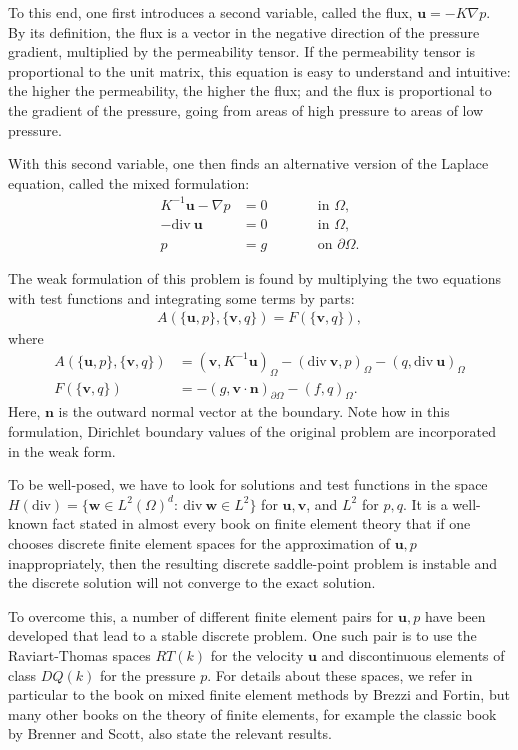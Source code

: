 \documentclass{article}
\renewcommand{\vec}[1]{\mathbf{#1}}
\begin{document}
To this end, one first introduces a second variable, called the flux, $\vec
u=-K\nabla p$. By its definition, the flux is a vector in the negative
direction of the pressure gradient, multiplied by the permeability tensor. If
the permeability tensor is proportional to the unit matrix, this equation is
easy to understand and intuitive: the higher the permeability, the higher the
flux; and the flux is proportional to the gradient of the pressure, going from
areas of high pressure to areas of low pressure.

With this second variable, one then finds an alternative version of the
Laplace equation, called the mixed formulation:
\begin{align*}
  K^{-1} \vec u - \nabla p &= 0 \qquad && \text{in $\Omega$}, \\
  -\text{div}\ \vec u &= 0 \qquad && \text{in $\Omega$}, \\
  p &= g \qquad && \text{on $\partial\Omega$}.
\end{align*}

The weak formulation of this problem is found by multiplying the two
equations with test functions and integrating some terms by parts:
\begin{align*}
  A(\{\vec u,p\},\{\vec v,q\}) = F(\{\vec v,q\}),
\end{align*}
where
\begin{align*}
  A(\{\vec u,p\},\{\vec v,q\})
  &=
  (\vec v, K^{-1}\vec u)_\Omega - (\text{div}\ \vec v, p)_\Omega
  - (q,\text{div}\ \vec u)_\Omega
  \\
  F(\{\vec v,q\}) &= -(g,\vec v\cdot \vec n)_{\partial\Omega} - (f,q)_\Omega.
\end{align*}
Here, $\vec n$ is the outward normal vector at the boundary. Note how in this
formulation, Dirichlet boundary values of the original problem are
incorporated in the weak form.

To be well-posed, we have to look for solutions and test functions in the
space $H(\text{div})=\{\vec w\in L^2(\Omega)^d:\ \text{div}\ \vec w\in L^2\}$
for $\vec u,\vec v$, and $L^2$ for $p,q$. It is a well-known fact stated in
almost every book on finite element theory that if one chooses discrete finite
element spaces for the approximation of $\vec u,p$ inappropriately, then the
resulting discrete saddle-point problem is instable and the discrete solution
will not converge to the exact solution.

To overcome this, a number of different finite element pairs for $\vec u,p$
have been developed that lead to a stable discrete problem. One such pair is
to use the Raviart-Thomas spaces $RT(k)$ for the velocity $\vec u$ and
discontinuous elements of class $DQ(k)$ for the pressure $p$. For details
about these spaces, we refer in particular to the book on mixed finite element
methods by Brezzi and Fortin, but many other books on the theory of finite
elements, for example the classic book by Brenner and Scott, also state the
relevant results.
\end{document}
